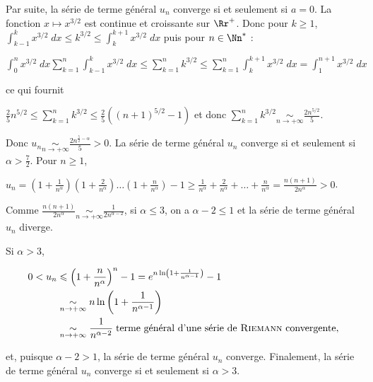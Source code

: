 {{Par suite, la série de terme général $u_n$ converge si et seulement si $a = 0$.
La fonction $x\mapsto x^{3/2}$ est continue et croissante sur $\Rr^+$. Donc pour $k\geqslant 1$, $\int_{k-1}^{k}x^{3/2}\;dx\leqslant k^{3/2}\leqslant\int_{k}^{k+1}x^{3/2}\;dx$ puis pour $n\in\Nn^*$ :

\begin{center}
$\int_{0}^{n}x^{3/2}\;dx\sum_{k=1}^{n}\int_{k-1}^{k}x^{3/2}\;dx\leqslant\sum_{k=1}^{n}k^{3/2}\leqslant\sum_{k=1}^{n}\int_{k}^{k+1}x^{3/2}\;dx=\int_{1}^{n+1}x^{3/2}\;dx$
\end{center}

ce qui fournit

\begin{center}
$\frac{2}{5}n^{5/2}\leqslant\sum_{k=1}^{n}k^{3/2}\leqslant\frac{2}{5}((n+1)^{5/2}-1)$ et donc $\sum_{k=1}^{n}k^{3/2}\underset{n\rightarrow+\infty}{\sim}\frac{2n^{5/2}}{5}$.
\end{center}

Donc $u_n\underset{n\rightarrow+\infty}{\sim}\frac{2n^{\frac{5}{2}-\alpha}}{5}>0$. La série de terme général $u_n$ converge si et seulement si $\alpha>\frac{7}{2}$.
Pour $n\geqslant1$,

\begin{center}
$u_n =\left(1+\frac{1}{n^\alpha}\right)\left(1+\frac{2}{n^\alpha}\right)\ldots\left(1+\frac{n}{n^\alpha}\right)-1\geqslant\frac{1}{n^\alpha}+\frac{2}{n^\alpha}+\ldots+\frac{n}{n^\alpha}=\frac{n(n+1)}{2n^\alpha}>0$.
\end{center}

Comme $\frac{n(n+1)}{2n^\alpha}\underset{n\rightarrow+\infty}{\sim}\frac{1}{2n^{\alpha-2}}$, si $\alpha\leqslant3$, on a $\alpha-2\leqslant1$ et la série de terme général $u_n$ diverge.

Si $\alpha> 3$,

\begin{align*}\ensuremath
0 < u_n&\leqslant\left(1+\frac{n}{n^\alpha}\right)^n -1= e^{n\ln\left(1+\frac{1}{n^{\alpha-1}}\right)}-1\\
 &\underset{n\rightarrow+\infty}{\sim}n\ln\left(1+\frac{1}{n^{\alpha-1}}\right)\\
 &\underset{n\rightarrow+\infty}{\sim}\frac{1}{n^{\alpha-2}}\;\text{terme général d'une série de \textsc{Riemann} convergente},
\end{align*}
			   
			   
et, puisque $\alpha-2>1$,  la série de terme général $u_n$ converge. Finalement, la série de terme général $u_n$ converge si et seulement si $\alpha > 3$.
}
}
